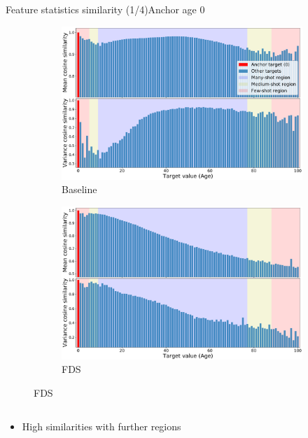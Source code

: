 \begin{frame}{Feature statistics similarity (1/4)}{Anchor age 0}
	\begin{figure}[h]
		\begin{subfigure}{0.48\textwidth}
			\includegraphics[width=\linewidth]{images/feat_sim_fds_base_0.pdf}
			\caption{Baseline}
		\end{subfigure}\hspace{1em}%
		\begin{subfigure}{0.48\textwidth}
			\includegraphics[width=\linewidth]{images/feat_sim_fds_ours_0.pdf}
			\caption{FDS}
		\end{subfigure}
	\end{figure}
	\vspace{-1em}
	\begin{columns}
		\footnotesize
		\begin{column}{0.5\textwidth}
			\begin{itemize}
				\item High similarities with further regions

\end{itemize}
\end{column}
\end{columns}
\end{frame}
